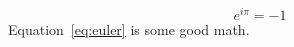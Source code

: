 
  \begin{equation}
    e^{i\pi}=-1
    \label{eq:euler}
  \end{equation}
  Equation~\ref{eq:euler} is some good math.

